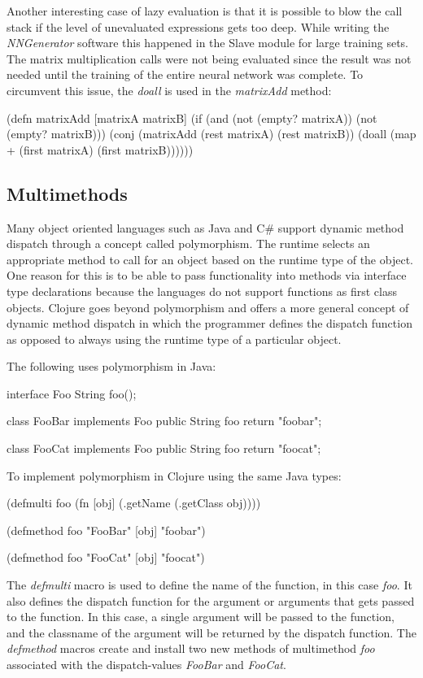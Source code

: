 Another interesting case of lazy evaluation is that it is possible to
blow the call stack if the level of unevaluated expressions gets too
deep. While writing the {\em NNGenerator} software this happened in
the Slave module for large training sets. The matrix multiplication
calls were not being evaluated since the result was not needed until
the training of the entire neural network was complete.
To circumvent this issue, the {\it doall} is used in the {\it
  matrixAdd} method:
 
(defn matrixAdd [matrixA matrixB]
  (if (and (not (empty? matrixA)) (not (empty? matrixB)))
    (conj
      (matrixAdd (rest matrixA) (rest matrixB))
      (doall (map + (first matrixA) (first matrixB))))))

\subsection{Multimethods}
Many object oriented languages such as Java and C\# support dynamic
method dispatch through a concept called polymorphism. 
The runtime selects an appropriate method to call for an object based
on the runtime type of the object. 
One reason for this is to be able to pass functionality into methods via interface type declarations because the languages do not support functions as first class objects. 
Clojure goes beyond polymorphism and offers a more general concept of dynamic method dispatch in which the programmer defines
the dispatch function as opposed to always using the runtime type of a particular object. 

The following uses polymorphism in Java:

interface Foo { 
	String foo(); 
}

class FooBar implements Foo {
        public String foo { return "foobar"; }
}

class FooCat implements Foo {
        public String foo { return "foocat"; }
}

To implement polymorphism in Clojure using the same Java types:

(defmulti foo (fn [obj] (.getName (.getClass obj))))

(defmethod foo "FooBar" [obj] "foobar")

(defmethod foo "FooCat" [obj] "foocat")

The {\it defmulti} macro is used to define the name of the function, in this
case {\it foo}. It also defines the dispatch function for the argument
or arguments that gets passed to the function. In this case, a single
argument will be passed to the function, and the classname of the
argument will be returned by the dispatch function.
The {\it defmethod} macros create and install two new methods of
multimethod {\it foo} associated with the dispatch-values {\it FooBar}
and {\it FooCat}. 

